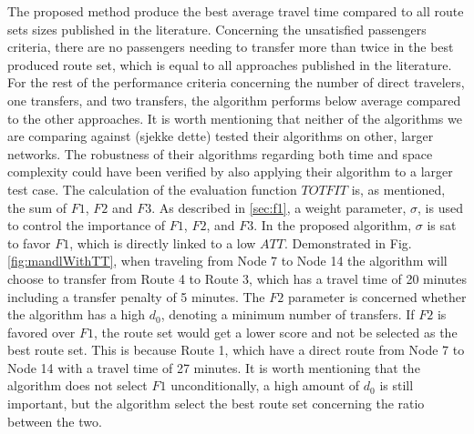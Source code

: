 The proposed method produce the best average travel time compared to all route sets sizes published in the literature. Concerning the unsatisfied passengers criteria, there are no passengers needing to transfer more than twice in the best produced route set, which is equal to all approaches published in the literature. For the rest of the performance criteria concerning the number of direct travelers, one transfers, and two transfers, the algorithm performs below average compared to the other approaches. It is worth mentioning that neither of the algorithms we are comparing against (sjekke dette) tested their algorithms on other, larger networks. The robustness of their algorithms regarding both time and space complexity could have been verified by also applying their algorithm to a larger test case. %
The calculation of the evaluation function $TOTFIT$ is, as mentioned, the sum of $F1$, $F2$ and $F3$. As described in \vref{sec:f1}, a weight parameter, $\sigma$, is used to control the importance of $F1$, $F2$, and $F3$. In the proposed algorithm, $\sigma$ is sat to favor $F1$, which is directly linked to a low $ATT$. Demonstrated in Fig. \vref{fig:mandlWithTT}, when traveling from Node 7 to Node 14 the algorithm will choose to transfer from Route 4 to Route 3, which has a travel time of 20 minutes including a transfer penalty of 5 minutes. The $F2$ parameter is concerned whether the algorithm has a high $d_0$, denoting a minimum number of transfers. If $F2$ is favored over $F1$, the route set would get a lower score and not be selected as the best route set. This is because Route 1, which have a direct route from Node 7 to Node 14 with a travel time of 27 minutes. It is worth mentioning that the algorithm does not select $F1$ unconditionally, a high amount of $d_0$ is still important, but the algorithm select the best route set concerning the ratio between the two.

